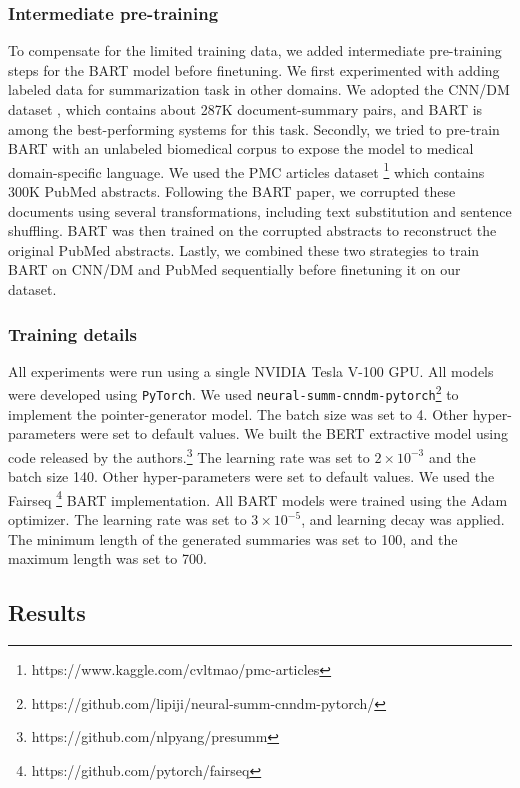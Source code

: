 \documentclass[letterpaper, table]{article} %
\begin{document}
\subsubsection{Intermediate pre-training}
\label{sec:inter-pretraining}
To compensate for the limited training data, we added intermediate pre-training steps for the BART model before finetuning.
We first experimented with adding labeled data for summarization task in other domains. We adopted the CNN/DM dataset \cite{nallapati2016abstractive}, which contains about 287K document-summary pairs, and BART is among the best-performing systems for this task. %
Secondly, we tried to pre-train BART with an unlabeled biomedical corpus to expose the model to medical domain-specific language. We used the PMC articles dataset \footnote{https://www.kaggle.com/cvltmao/pmc-articles}
which contains 300K PubMed abstracts. Following the BART paper, we corrupted these documents using several transformations, including text substitution and sentence shuffling. BART was then trained on the corrupted abstracts to reconstruct the original PubMed abstracts. Lastly, we combined these two strategies to train BART on CNN/DM and PubMed sequentially before finetuning it on our dataset.
\subsubsection{Training details}
All experiments were run using a single NVIDIA Tesla V-100 GPU. All models were developed using \texttt{PyTorch}.
We used \texttt{neural-summ-cnndm-pytorch}\footnote{https://github.com/lipiji/neural-summ-cnndm-pytorch/} to implement the pointer-generator model. The batch size was set to 4. Other hyper-parameters were set to default values. We built the BERT extractive model using code released by the authors.\footnote{https://github.com/nlpyang/presumm}
The learning rate was set to $2 \times 10^{-3}$ and the batch size 140. Other hyper-parameters were set to default values. We used the Fairseq \footnote{https://github.com/pytorch/fairseq} BART implementation. All BART models were trained using the Adam optimizer. The learning rate was set to $3 \times 10^{-5}$, and learning decay was applied. The minimum length of the generated summaries was set to 100, and the maximum length was set to 700.
\subsection{Results}
\end{document}
